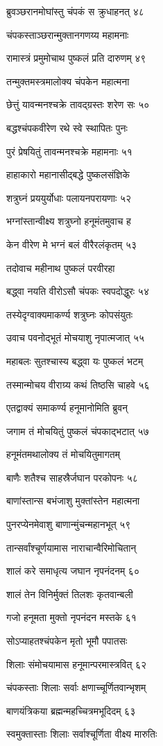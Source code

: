 ब्रुवञ्छरानमोघांस्तु चंपकं स क्रुधाहनत् ४८

चंपकस्ताञ्छरान्मुक्तानगणय्य महामनाः

रामास्त्रं प्रमुमोचाथ पुष्कलं प्रति दारुणम् ४९

तन्मुक्तमस्त्रमालोक्य चंपकेन महात्मना

छेत्तुं यावन्मनश्चक्रे तावद्ग्रस्तः शरेण सः ५०

बद्धश्चंपकवीरेण रथे स्वे स्थापितः पुनः

पुरं प्रेषयितुं तावन्मनश्चक्रे महामनाः ५१

हाहाकारो महानासीद्बद्धे पुष्कलसंज्ञिके

शत्रुघ्नं प्रययुर्योधाः पलायनपरायणाः ५२

भग्नांस्तान्वीक्ष्य शत्रुघ्नो हनूमंतमुवाच ह

केन वीरेण मे भग्नं बलं वीरैरलंकृतम् ५३

तदोवाच महीनाथ पुष्कलं परवीरहा

बद्ध्वा नयति वीरोऽसौ चंपकः स्वपदोद्धुरः ५४

तस्येदृग्वाक्यमाकर्ण्य शत्रुघ्नः कोपसंयुतः

उवाच पवनोद्भूतं मोचयाशु नृपात्मजात् ५५

महाबलः सुतश्चास्य बद्ध्वा यः पुष्कलं भटम्

तस्मान्मोचय वीराग्र्य कथं तिष्ठसि चाहवे ५६

एतद्वाक्यं समाकर्ण्य हनूमानोमिति ब्रुवन्

जगाम तं मोचयितुं पुष्कलं चंपकाद्भटात् ५७

हनूमंतमथालोक्य तं मोचयितुमागतम्

बाणैः शतैश्च साहस्रैर्जघान परकोपनः ५८

बाणांस्तान्स बभंजाशु मुक्तांस्तेन महात्मना

पुनरप्येनमेवाशु बाणान्मुंचन्महानभूत् ५९

तान्सर्वांश्चूर्णयामास नाराचान्वैरिमोचितान्

शालं करे समाधृत्य जघान नृपनंदनम् ६०

शालं तेन विनिर्मुक्तं तिलशः कृतवान्बली

गजो हनूमता मुक्तो नृपनंदन मस्तके ६१

सोऽप्याहतश्चंपकेन मृतो भूमौ पपातसः

शिलाः संमोचयामास हनूमान्परमास्त्रवित् ६२

चंपकस्ताः शिलाः सर्वाः क्षणाच्चूर्णितवान्भृशम्

बाणयंत्रिकया ब्रह्मन्महच्चित्रमभूदिदम् ६३

स्वमुक्तास्ताः शिलाः सर्वाश्चूर्णिता वीक्ष्य मारुतिः

